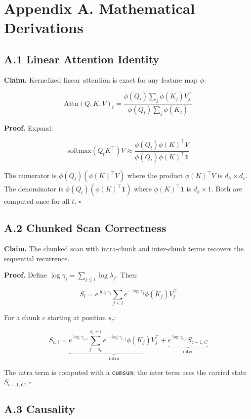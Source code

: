 
\section{Appendix A. Mathematical Derivations}

\subsection{A.1 Linear Attention Identity}

\textbf{Claim.} Kernelized linear attention is exact for any feature map $\phi$:

\[
\text{Attn}(Q, K, V)_t = \frac{\phi(Q_t) \sum_j \phi(K_j) V_j^\top}{\phi(Q_t) \sum_j \phi(K_j)}
\tag{A.1}
\]

\textbf{Proof.} Expand:

\[
\text{softmax}(Q_t K^\top) V \approx \frac{\phi(Q_t) \phi(K)^\top V}{\phi(Q_t) \phi(K)^\top \mathbf{1}}
\]

The numerator is $\phi(Q_t) (\phi(K)^\top V)$ where the product 
$\phi(K)^\top V$ is $d_h \times d_v$. The denominator is 
$\phi(Q_t) (\phi(K)^\top \mathbf{1})$ where $\phi(K)^\top \mathbf{1}$ is 
$d_h \times 1$. Both are computed once for all $t$. $\square$

\subsection{A.2 Chunked Scan Correctness}

\textbf{Claim.} The chunked scan with intra-chunk and inter-chunk terms 
recovers the sequential recurrence.

\textbf{Proof.} Define $\log \gamma_i = \sum_{j \leq i} \log \lambda_j$. Then:

\[
S_i = e^{\log \gamma_i} \sum_{j \leq i} e^{-\log \gamma_j} \phi(K_j) V_j^\top
\tag{A.2}
\]

For a chunk $c$ starting at position $s_c$:

\[
S_{c, i} = \underbrace{e^{\log \gamma_{c, i}} \sum_{j=s_c}^{s_c+i} e^{-\log \gamma_{c, j}} \phi(K_j) V_j^\top}_{\text{intra}} + \underbrace{e^{\log \gamma_{c, i}} S_{c-1, C}}_{\text{inter}}
\tag{A.3}
\]

The intra term is computed with a \texttt{cumsum}; the inter term uses the 
carried state $S_{c-1, C}$. $\square$

\subsection{A.3 Causality}

